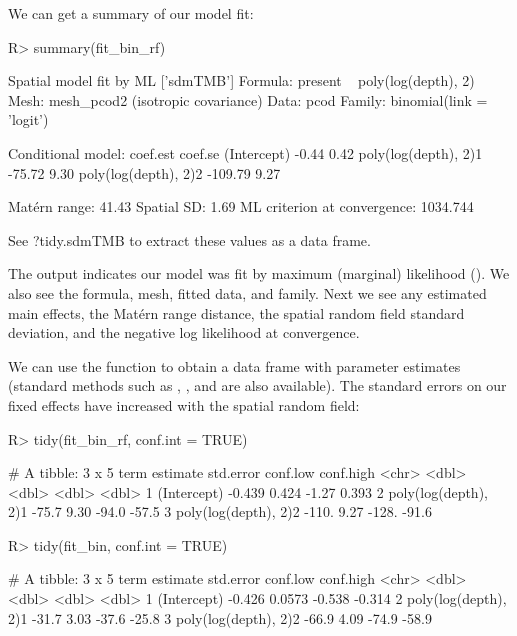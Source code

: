 \documentclass[article]{jss}\usepackage[]{graphicx}\usepackage[dvipsnames]{xcolor}
\newcommand{\fct}[1]{\code{#1()}}
\begin{document}
We can get a summary of our model fit:

\begin{Schunk}
\begin{Sinput}
R> summary(fit_bin_rf)
\end{Sinput}
\begin{Soutput}
Spatial model fit by ML ['sdmTMB']
Formula: present ~ poly(log(depth), 2)
Mesh: mesh_pcod2 (isotropic covariance)
Data: pcod
Family: binomial(link = 'logit')

Conditional model:
                     coef.est coef.se
(Intercept)             -0.44    0.42
poly(log(depth), 2)1   -75.72    9.30
poly(log(depth), 2)2  -109.79    9.27

Matérn range: 41.43
Spatial SD: 1.69
ML criterion at convergence: 1034.744

See ?tidy.sdmTMB to extract these values as a data frame.
\end{Soutput}
\end{Schunk}

The output indicates our model was fit by maximum (marginal) likelihood ().
We also see the formula, mesh, fitted data, and family.
Next we see any estimated main effects, the Matérn range distance, the spatial random field standard deviation, and the negative log likelihood at convergence.

We can use the \fct{tidy} function to obtain a data frame with parameter estimates (standard methods such as \fct{fixef}, \fct{confint}, and \fct{vcov} are also available).
The standard errors on our fixed effects have increased with the spatial random field:

\begin{Schunk}
\begin{Sinput}
R> tidy(fit_bin_rf, conf.int = TRUE)
\end{Sinput}
\begin{Soutput}
# A tibble: 3 x 5
  term                 estimate std.error conf.low conf.high
  <chr>                   <dbl>     <dbl>    <dbl>     <dbl>
1 (Intercept)            -0.439     0.424    -1.27     0.393
2 poly(log(depth), 2)1  -75.7       9.30    -94.0    -57.5
3 poly(log(depth), 2)2 -110.        9.27   -128.     -91.6
\end{Soutput}
\begin{Sinput}
R> tidy(fit_bin, conf.int = TRUE)
\end{Sinput}
\begin{Soutput}
# A tibble: 3 x 5
  term                 estimate std.error conf.low conf.high
  <chr>                   <dbl>     <dbl>    <dbl>     <dbl>
1 (Intercept)            -0.426    0.0573   -0.538    -0.314
2 poly(log(depth), 2)1  -31.7      3.03    -37.6     -25.8
3 poly(log(depth), 2)2  -66.9      4.09    -74.9     -58.9
\end{Soutput}
\end{Schunk}
\end{document}
